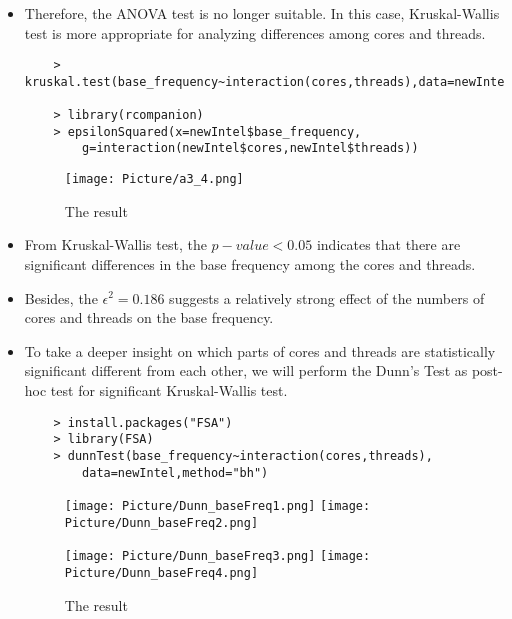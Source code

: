 \documentclass[a4paper]{article}
\begin{document}
\begin{itemize}
    \item[] Therefore, the ANOVA test is no longer suitable. In this case, Kruskal-Wallis test is more appropriate for analyzing differences among cores and threads.
    \begin{lstlisting}
    > kruskal.test(base_frequency~interaction(cores,threads),data=newIntel)
    
    > library(rcompanion)
    > epsilonSquared(x=newIntel$base_frequency,
        g=interaction(newIntel$cores,newIntel$threads))
    \end{lstlisting}
    
    \begin{figure}[H]
        \centering
        \texttt{[image: Picture/a3\_4.png]}
        \caption{The result}
        \label{7.1.7}
    \end{figure}
    
    \item[] From Kruskal-Wallis test, the $p-value < 0.05$ indicates that there are significant differences in the base frequency among the cores and threads.
    
    \item[] Besides, the $\epsilon^2 = 0.186$ suggests a relatively strong effect of the numbers of cores and threads on the base frequency.
    
    \item[] To take a deeper insight on which parts of cores and threads are statistically significant different from each other, we will perform the Dunn's Test as post-hoc test for significant Kruskal-Wallis test.
    \begin{lstlisting}
    > install.packages("FSA")
    > library(FSA)
    > dunnTest(base_frequency~interaction(cores,threads),
        data=newIntel,method="bh")
    \end{lstlisting}
    
    \begin{figure}[H]
        \centering
        \texttt{[image: Picture/Dunn\_baseFreq1.png]}
        \hfill
        \texttt{[image: Picture/Dunn\_baseFreq2.png]}
        \label{7.1.8}
    \end{figure}
    
    \begin{figure}[H]
        \centering
        \texttt{[image: Picture/Dunn\_baseFreq3.png]}
        \hfill
        \texttt{[image: Picture/Dunn\_baseFreq4.png]}
        \caption{The result}
        \label{7.1.9}
    \end{figure}
    

\end{itemize}
\end{document}
